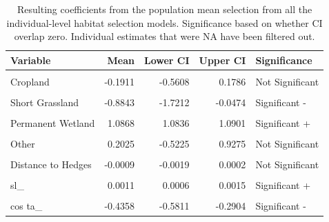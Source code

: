 \documentclass[10pt,a4paper]{article}
\begin{document}
\begin{table}[!h]
\centering
\caption{\label{tab:sffPopTable}Resulting coefficients from the population mean selection from all the individual-level habitat selection models. Significance based on whether CI overlap zero. Individual estimates that were NA have been filtered out.}
\centering
\begin{tabular}[t]{lrrrl}
\toprule
Variable & Mean & Lower CI & Upper CI & Significance\\
\midrule
\cellcolor{gray!10}{Evergreen Needleleaf Forest} & \cellcolor{gray!10}{-0.0716} & \cellcolor{gray!10}{-0.3109} & \cellcolor{gray!10}{0.1677} & \cellcolor{gray!10}{Not Significant}\\
Cropland & -0.1911 & -0.5608 & 0.1786 & Not Significant\\
\cellcolor{gray!10}{Tall Grassland} & \cellcolor{gray!10}{-0.2990} & \cellcolor{gray!10}{-0.5722} & \cellcolor{gray!10}{-0.0257} & \cellcolor{gray!10}{Significant -}\\
Short Grassland & -0.8843 & -1.7212 & -0.0474 & Significant -\\
\cellcolor{gray!10}{Open Shrubland} & \cellcolor{gray!10}{0.0284} & \cellcolor{gray!10}{-0.6327} & \cellcolor{gray!10}{0.6895} & \cellcolor{gray!10}{Not Significant}\\
\addlinespace
Permanent Wetland & 1.0868 & 1.0836 & 1.0901 & Significant +\\
\cellcolor{gray!10}{Human Settlements} & \cellcolor{gray!10}{-1.6119} & \cellcolor{gray!10}{-1.6303} & \cellcolor{gray!10}{-1.5935} & \cellcolor{gray!10}{Significant -}\\
Other & 0.2025 & -0.5225 & 0.9275 & Not Significant\\
\cellcolor{gray!10}{Distance to Woodland} & \cellcolor{gray!10}{-0.0051} & \cellcolor{gray!10}{-0.0095} & \cellcolor{gray!10}{-0.0008} & \cellcolor{gray!10}{Significant -}\\
Distance to Hedges & -0.0009 & -0.0019 & 0.0002 & Not Significant\\
\addlinespace
\cellcolor{gray!10}{Road Crossing} & \cellcolor{gray!10}{-0.5144} & \cellcolor{gray!10}{-0.8068} & \cellcolor{gray!10}{-0.2221} & \cellcolor{gray!10}{Significant -}\\
sl\_ & 0.0011 & 0.0006 & 0.0015 & Significant +\\
\cellcolor{gray!10}{log sl\_} & \cellcolor{gray!10}{0.0245} & \cellcolor{gray!10}{-0.0042} & \cellcolor{gray!10}{0.0533} & \cellcolor{gray!10}{Not Significant}\\
cos ta\_ & -0.4358 & -0.5811 & -0.2904 & Significant -\\
\bottomrule
\end{tabular}
\end{table}
\end{document}
